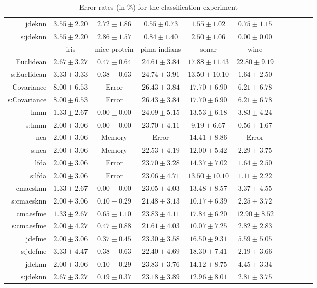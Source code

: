 \begin{table}[ht]
{\begin{tabular}{rcccccccccc}
\ac{jdeknn} & $3.55\pm2.20$ & $2.72\pm1.86$ & $0.55\pm0.73$ & $1.55\pm1.02$ & $0.75\pm1.15$ \\
s:\ac{jdeknn} & $3.55\pm2.20$ & $2.86\pm1.57$ & $0.84\pm1.40$ & $2.50\pm1.06$ & $\bm{0.00\pm0.00}$ \\
\midrule
& \multicolumn{1}{c}{iris} & \multicolumn{1}{c}{mice-protein} & \multicolumn{1}{c}{pima-indians} & \multicolumn{1}{c}{sonar} & \multicolumn{1}{c}{wine} \\ 
\midrule
Euclidean & $2.67\pm3.27$ & $0.47\pm0.64$ & $24.61\pm3.84$ & $17.88\pm11.43$ & $22.80\pm9.19$ \\
s:Euclidean & $3.33\pm3.33$ & $0.38\pm0.63$ & $24.74\pm3.91$ & $13.50\pm10.10$ & $1.64\pm2.50$ \\
Covariance & $8.00\pm6.53$ & Error  & $26.43\pm3.84$ & $17.70\pm6.90$ & $6.21\pm6.78$ \\
s:Covariance & $8.00\pm6.53$ & Error  & $26.43\pm3.84$ & $17.70\pm6.90$ & $6.21\pm6.78$ \\
\ac{lmnn} & $\bm{1.33\pm2.67}$ & $\bm{0.00\pm0.00}$ & $24.09\pm5.15$ & $13.53\pm6.18$ & $3.83\pm4.24$ \\
s:\ac{lmnn} & $2.00\pm3.06$ & $\bm{0.00\pm0.00}$ & $23.70\pm4.11$ & $\bm{9.19\pm6.67}$ & $\bm{0.56\pm1.67}$ \\
\ac{nca} & $2.00\pm3.06$ & Memory  & Error  & $14.41\pm8.86$ & Error  \\
s:\ac{nca} & $2.00\pm3.06$ & Memory  & $22.53\pm4.19$ & $12.00\pm5.42$ & $2.29\pm3.75$ \\
\ac{lfda} & $2.00\pm3.06$ & Error  & $23.70\pm3.28$ & $14.37\pm7.02$ & $1.64\pm2.50$ \\
s:\ac{lfda} & $2.00\pm3.06$ & Error  & $23.06\pm4.71$ & $13.50\pm10.10$ & $1.11\pm2.22$ \\
\ac{cmaesknn} & $\bm{1.33\pm2.67}$ & $\bm{0.00\pm0.00}$ & $23.05\pm4.03$ & $13.48\pm8.57$ & $3.37\pm4.55$ \\
s:\ac{cmaesknn} & $2.00\pm3.06$ & $0.10\pm0.29$ & $\bm{21.48\pm3.13}$ & $10.17\pm6.39$ & $2.25\pm3.72$ \\
\ac{cmaesfme} & $\bm{1.33\pm2.67}$ & $0.65\pm1.10$ & $23.83\pm4.11$ & $17.84\pm6.20$ & $12.90\pm8.52$ \\
s:\ac{cmaesfme} & $2.00\pm4.27$ & $0.47\pm0.88$ & $21.61\pm4.03$ & $10.07\pm7.25$ & $2.82\pm2.83$ \\
\ac{jdefme} & $2.00\pm3.06$ & $0.37\pm0.45$ & $23.30\pm3.58$ & $16.50\pm9.31$ & $5.59\pm5.05$ \\
s:\ac{jdefme} & $3.33\pm4.47$ & $0.38\pm0.63$ & $22.40\pm4.69$ & $18.30\pm7.41$ & $2.19\pm3.66$ \\
\ac{jdeknn} & $2.00\pm3.06$ & $0.10\pm0.29$ & $23.83\pm3.76$ & $14.12\pm8.75$ & $4.45\pm3.34$ \\
s:\ac{jdeknn} & $2.67\pm3.27$ & $0.19\pm0.37$ & $23.18\pm3.89$ & $12.96\pm8.01$ & $2.81\pm3.75$ \\


\bottomrule
\end{tabular}
}
\caption{Error rates (in \%) for the classification experiment} \label{tab:error-rates}
\end{table}
